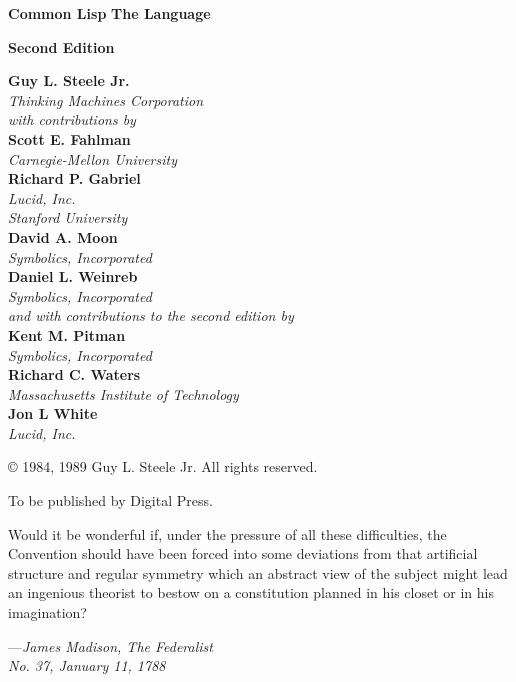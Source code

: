 
\ifx \rulang\Undef

\noindent\textbf{Common Lisp}
\noindent\textbf{The Language}

\noindent\textbf{Second Edition}

\begin{flushleft}
\textbf{Guy L. Steele Jr.} \\
\emph{Thinking Machines Corporation} \\
\emph{with contributions by} \\
\textbf{Scott E. Fahlman} \\
\emph{Carnegie-Mellon University} \\
\textbf{Richard P. Gabriel} \\
\emph{Lucid, Inc.} \\
\emph{Stanford University} \\
\textbf{David A. Moon} \\
\emph{Symbolics, Incorporated} \\
\textbf{Daniel L. Weinreb} \\
\emph{Symbolics, Incorporated} \\
\emph{and with contributions to the second edition by} \\
\textbf{Kent M. Pitman} \\
\emph{Symbolics, Incorporated} \\
\textbf{Richard C. Waters} \\
\emph{Massachusetts Institute of Technology} \\
\textbf{Jon L White} \\
\emph{Lucid, Inc.}
\end{flushleft}

\begin{center}
\copyright{} 1984, 1989 Guy L. Steele Jr. All rights reserved.
\end{center}

\begin{flushright}
To be published by Digital Press.
\end{flushright}

\newpage

Would it be wonderful if, under the pressure of all these difficulties,
the Convention should have been forced into some deviations from that
artificial structure and regular symmetry which an abstract view of the
subject might lead an ingenious theorist to bestow on a constitution
planned in his closet or in his imagination?
\begin{tabbing}
---\=\emph{James Madison, The Federalist} \\
\>\emph{No. 37, January 11, 1788}
\end{tabbing}

